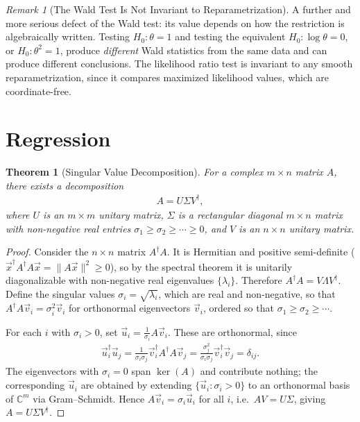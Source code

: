 \documentclass[11pt]{article}
\theoremstyle{definition}
\theoremstyle{plain}
\newtheorem{theorem}{Theorem}[section]
\theoremstyle{remark}
\newtheorem{remark}{Remark}[section]
\begin{document}
\begin{remark}[The Wald Test Is Not Invariant to Reparametrization]
    A further and more serious defect of the Wald test: its value depends on how the restriction is algebraically written. Testing $H_0 : \theta = 1$ and testing the equivalent $H_0 : \log\theta = 0$, or $H_0 : \theta^2 = 1$, produce \emph{different} Wald statistics from the same data and can produce different conclusions. The likelihood ratio test is invariant to any smooth reparametrization, since it compares maximized likelihood values, which are coordinate-free.
\end{remark}

\section{Regression}

\begin{theorem}[Singular Value Decomposition]
    For a complex $m \times n$ matrix $A$, there exists a decomposition
    \begin{align}
        A = U\Sigma V^\dagger ,
    \end{align}
    where $U$ is an $m \times m$ unitary matrix, $\Sigma$ is a rectangular diagonal $m \times n$ matrix with non-negative real entries $\sigma_1 \geq \sigma_2 \geq \cdots \geq 0$, and $V$ is an $n \times n$ unitary matrix.
\end{theorem}
\begin{proof}
    Consider the $n \times n$ matrix $A^\dagger A$. It is Hermitian and positive semi-definite ($\vec{x}^\dagger A^\dagger A\vec{x} = \|A\vec{x}\|^2 \geq 0$), so by the spectral theorem it is unitarily diagonalizable with non-negative real eigenvalues $\{\lambda_i\}$. Therefore $A^\dagger A = V\Lambda V^\dagger$. Define the singular values $\sigma_i = \sqrt{\lambda_i}$, which are real and non-negative, so that $A^\dagger A\vec{v}_i = \sigma_i^2\vec{v}_i$ for orthonormal eigenvectors $\vec{v}_i$, ordered so that $\sigma_1 \geq \sigma_2 \geq \cdots$.

    For each $i$ with $\sigma_i > 0$, set $\vec{u}_i = \frac{1}{\sigma_i}A\vec{v}_i$. These are orthonormal, since
    \begin{align}
        \vec{u}_i^\dagger \vec{u}_j = \frac{1}{\sigma_i\sigma_j}\vec{v}_i^\dagger A^\dagger A \vec{v}_j = \frac{\sigma_j^2}{\sigma_i\sigma_j}\vec{v}_i^\dagger\vec{v}_j = \delta_{ij}.
    \end{align}
    The eigenvectors with $\sigma_i = 0$ span $\ker(A)$ and contribute nothing; the corresponding $\vec{u}_i$ are obtained by extending $\{\vec{u}_i : \sigma_i > 0\}$ to an orthonormal basis of $\mathbb{C}^m$ via Gram--Schmidt. Hence $A\vec{v}_i = \sigma_i\vec{u}_i$ for all $i$, i.e.\ $AV = U\Sigma$, giving $A = U\Sigma V^\dagger$.
\end{proof}
\end{document}
